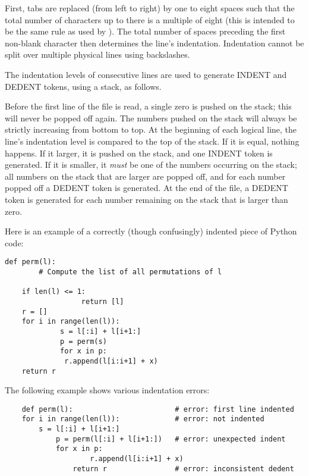 First, tabs are replaced (from left to right) by one to eight spaces
such that the total number of characters up to there is a multiple of
eight (this is intended to be the same rule as used by {\UNIX}).  The
total number of spaces preceding the first non-blank character then
determines the line's indentation.  Indentation cannot be split over
multiple physical lines using backslashes.

The indentation levels of consecutive lines are used to generate
INDENT and DEDENT tokens, using a stack, as follows.

Before the first line of the file is read, a single zero is pushed on
the stack; this will never be popped off again.  The numbers pushed on
the stack will always be strictly increasing from bottom to top.  At
the beginning of each logical line, the line's indentation level is
compared to the top of the stack.  If it is equal, nothing happens.
If it larger, it is pushed on the stack, and one INDENT token is
generated.  If it is smaller, it {\em must} be one of the numbers
occurring on the stack; all numbers on the stack that are larger are
popped off, and for each number popped off a DEDENT token is
generated.  At the end of the file, a DEDENT token is generated for
each number remaining on the stack that is larger than zero.

Here is an example of a correctly (though confusingly) indented piece
of Python code:

\begin{verbatim}
def perm(l):
        # Compute the list of all permutations of l

    if len(l) <= 1:
                  return [l]
    r = []
    for i in range(len(l)):
             s = l[:i] + l[i+1:]
             p = perm(s)
             for x in p:
              r.append(l[i:i+1] + x)
    return r
\end{verbatim}

The following example shows various indentation errors:

\begin{verbatim}
    def perm(l):                        # error: first line indented
    for i in range(len(l)):             # error: not indented
        s = l[:i] + l[i+1:]
            p = perm(l[:i] + l[i+1:])   # error: unexpected indent
            for x in p:
                    r.append(l[i:i+1] + x)
                return r                # error: inconsistent dedent
\end{verbatim}

